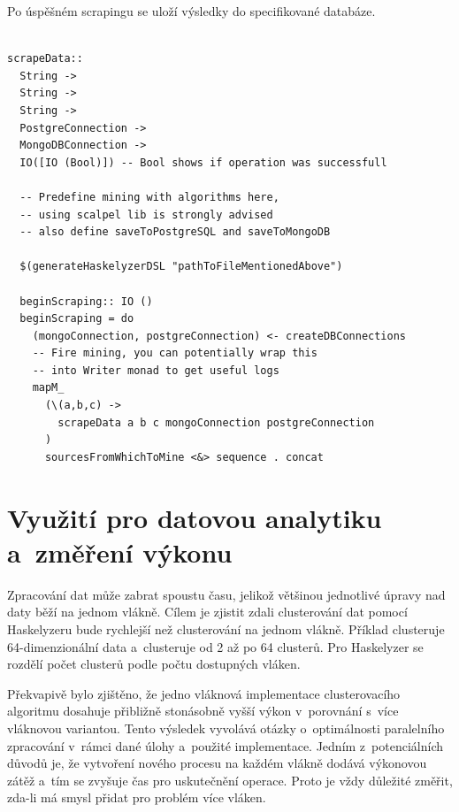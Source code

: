 \documentclass[male, czech]{kithesis}
\newenvironment{code}{\captionsetup{type=listing}}{}
\begin{document}
Po úspěšném scrapingu se uloží výsledky do specifikované databáze.

\begin{code}
\begin{verbatim}

scrapeData:: 
  String -> 
  String -> 
  String -> 
  PostgreConnection -> 
  MongoDBConnection -> 
  IO([IO (Bool)]) -- Bool shows if operation was successfull

  -- Predefine mining with algorithms here, 
  -- using scalpel lib is strongly advised
  -- also define saveToPostgreSQL and saveToMongoDB

  $(generateHaskelyzerDSL "pathToFileMentionedAbove")

  beginScraping:: IO ()
  beginScraping = do
    (mongoConnection, postgreConnection) <- createDBConnections
    -- Fire mining, you can potentially wrap this 
    -- into Writer monad to get useful logs
    mapM_ 
      (\(a,b,c) -> 
        scrapeData a b c mongoConnection postgreConnection
      ) 
      sourcesFromWhichToMine <&> sequence . concat
\end{verbatim}
\end{code}

\newpage

\section{Využití pro datovou analytiku a~změření výkonu}
 
Zpracování dat může zabrat spoustu času, 
jelikož většinou jednotlivé úpravy nad daty běží na jednom vlákně.
Cílem je zjistit zdali clusterování dat pomocí 
Haskelyzeru bude rychlejší než clusterování na jednom vlákně.
Příklad clusteruje 64-dimenzionální data a~clusteruje 
od 2 až po 64 clusterů. 
Pro Haskelyzer se rozdělí počet clusterů podle počtu dostupných vláken.

Překvapivě bylo zjištěno, 
že jedno vláknová implementace clusterovacího algoritmu 
dosahuje přibližně stonásobně vyšší výkon v~porovnání s~více vláknovou variantou. 
Tento výsledek vyvolává otázky o~optimálnosti paralelního zpracování v~rámci dané úlohy 
a~použité implementace.
Jedním z~potenciálních důvodů je, 
že vytvoření nového procesu na každém vlákně dodává výkonovou zátěž
a~tím se zvyšuje čas pro uskutečnění operace.
Proto je vždy důležité změřit, 
zda-li má smysl přidat pro problém více vláken.
\end{document}
